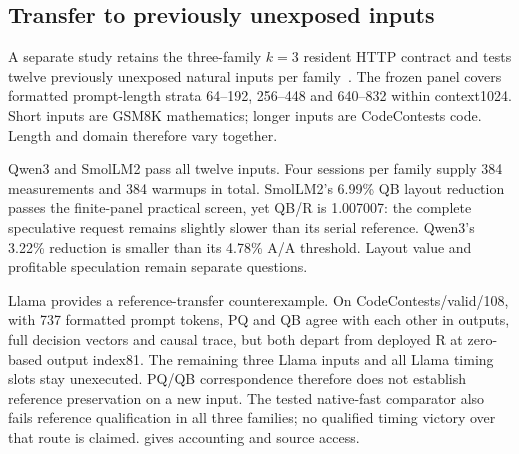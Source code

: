 \subsection{Transfer to previously unexposed inputs}
\label{sec:transfer}
A separate study retains the three-family $k=3$ resident HTTP contract and tests twelve previously unexposed natural inputs per family~\cite{rtxtransferrecords}. The frozen panel covers formatted prompt-length strata 64--192, 256--448 and 640--832 within context1024. Short inputs are GSM8K mathematics; longer inputs are CodeContests code. Length and domain therefore vary together.



Qwen3 and SmolLM2 pass all twelve inputs. Four sessions per family supply 384 measurements and 384 warmups in total. SmolLM2's 6.99\% QB layout reduction passes the finite-panel practical screen, yet QB/R is 1.007007: the complete speculative request remains slightly slower than its serial reference. Qwen3's 3.22\% reduction is smaller than its 4.78\% A/A threshold. Layout value and profitable speculation remain separate questions.

Llama provides a reference-transfer counterexample. On CodeContests/valid/108, with 737 formatted prompt tokens, PQ and QB agree with each other in outputs, full decision vectors and causal trace, but both depart from deployed R at zero-based output index81. The remaining three Llama inputs and all Llama timing slots stay unexecuted. PQ/QB correspondence therefore does not establish reference preservation on a new input. The tested native-fast comparator also fails reference qualification in all three families; no qualified timing victory over that route is claimed.  gives accounting and source access.
